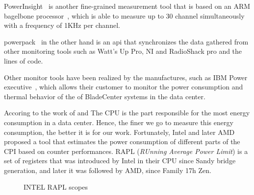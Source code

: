 PowerInsight~\cite{laros2013powerinsight} is another fine-grained measurement tool that is based on an ARM bagelbone processor~\cite{coley2012beaglebone}, which is able to measure up to 30 channel simultaneously with a frequency of 1KHz per channel.

powerpack~\cite{ge2009powerpack} in the other hand is an api that synchronizes the data gathered from other monitoring tools such as Watt’s Up Pro, NI and RadioShack pro and the lines of code. %

Other monitor tools have been realized by the manufactures, such as IBM Power executive~\cite{koomey2011growth}, which allows their customer to monitor the power consumption and thermal behavior of the of BladeCenter systems in the data center.


Accoring to the work of \citeauthor{vasques2019review} and\citeauthor{wang2018modelling}
The CPU is the part responsible for the most energy consumption in a data center\cite{vasques2019review,wang2018modelling}. Hence, the finer we go to measure this energy consumption, the better it is for our work.
Fortunately, Intel and later AMD proposed a tool that estimates the power consumption of different parts of the CPI based on counter performances.
RAPL (\emph{RUnning Average Power Limit}) \cite{hackenberg2013power,hackenberg2015energy} is a set of registers that was introduced by Intel in their CPU since Sandy bridge generation, and later it was followed by AMD, since Family 17h Zen.


\begin{figure}[!hbt]
    \caption{INTEL RAPL scopes
    }\label{fig:rapl-domaine}
\end{figure}

